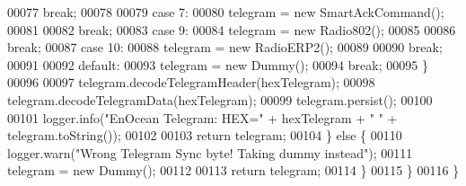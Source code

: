 \begin{DoxyCode}
00077                     \textcolor{keywordflow}{break};
00078 
00079                 \textcolor{keywordflow}{case} 7:
00080                     telegram = \textcolor{keyword}{new} SmartAckCommand();
00081 
00082                     \textcolor{keywordflow}{break};
00083                 \textcolor{keywordflow}{case} 9:
00084                     telegram = \textcolor{keyword}{new} Radio802();
00085 
00086                     \textcolor{keywordflow}{break};
00087                 \textcolor{keywordflow}{case} 10:
00088                     telegram = \textcolor{keyword}{new} RadioERP2();
00089 
00090                     \textcolor{keywordflow}{break};
00091 
00092                 \textcolor{keywordflow}{default}:
00093                     telegram = \textcolor{keyword}{new} Dummy();
00094                     \textcolor{keywordflow}{break};
00095             \}
00096 
00097             telegram.decodeTelegramHeader(hexTelegram);
00098             telegram.decodeTelegramData(hexTelegram);
00099             telegram.persist();
00100 
00101             logger.info(\textcolor{stringliteral}{"EnOcean Telegram: HEX="} + hexTelegram + \textcolor{stringliteral}{" "} + telegram.toString());
00102 
00103             \textcolor{keywordflow}{return} telegram;
00104         \} \textcolor{keywordflow}{else} \{
00110             logger.warn(\textcolor{stringliteral}{"Wrong Telegram Sync byte! Taking dummy instead"});
00111             telegram = \textcolor{keyword}{new} Dummy();
00112 
00113             \textcolor{keywordflow}{return} telegram;
00114         \}
00115     \}
00116 \}
\end{DoxyCode}
